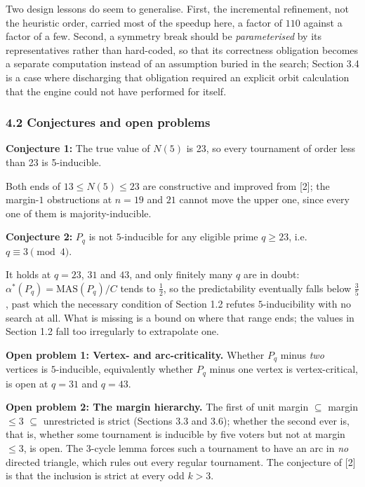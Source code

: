 \documentclass[
]{article}
\begin{document}
Two design lessons do seem to generalise. First, the incremental
refinement, not the heuristic order, carried most of the speedup here, a
factor of \(110\) against a factor of a few. Second, a symmetry break
should be \emph{parameterised} by its representatives rather than
hard-coded, so that its correctness obligation becomes a separate
computation instead of an assumption buried in the search; Section 3.4
is a case where discharging that obligation required an explicit orbit
calculation that the engine could not have performed for itself.

\subsubsection{4.2 Conjectures and open
problems}\label{conjectures-and-open-problems}

\textbf{Conjecture 1:} The true value of \(N(5)\) is 23, so every
tournament of order less than 23 is 5-inducible.

Both ends of \(13 \le N(5) \le 23\) are constructive and improved from
{[}2{]}; the margin-\(1\) obstructions at \(n = 19\) and \(21\) cannot
move the upper one, since every one of them is majority-inducible.

\textbf{Conjecture 2:} \(P_{q}\) is not \(5\)-inducible for any eligible
prime \(q \geq 23\), i.e.~\(q \equiv 3 \pmod 4\).

It holds at \(q = 23\), \(31\) and \(43\), and only finitely many \(q\)
are in doubt: \(\alpha^{*}(P_q) = \mathrm{MAS}(P_q)/C\) tends to
\(\tfrac{1}{2}\), so the predictability eventually falls below
\(\tfrac{3}{5}\), past which the necessary condition of Section 1.2
refutes \(5\)-inducibility with no search at all. What is missing is a
bound on where that range ends; the values in Section 1.2 fall too
irregularly to extrapolate one.

\textbf{Open problem 1: Vertex- and arc-criticality.} Whether \(P_{q}\)
minus \emph{two} vertices is \(5\)-inducible, equivalently whether
\(P_{q}\) minus one vertex is vertex-critical, is open at \(q = 31\) and
\(q = 43\).

\textbf{Open problem 2: The margin hierarchy.} The first of unit margin
\(\subseteq\) margin \(\le 3\) \(\subseteq\) unrestricted is strict
(Sections 3.3 and 3.6); whether the second ever is, that is, whether
some tournament is inducible by five voters but not at margin \(\le 3\),
is open. The 3-cycle lemma forces such a tournament to have an arc in
\emph{no} directed triangle, which rules out every regular tournament.
The conjecture of {[}2{]} is that the inclusion is strict at every odd
\(k > 3\).
\end{document}
